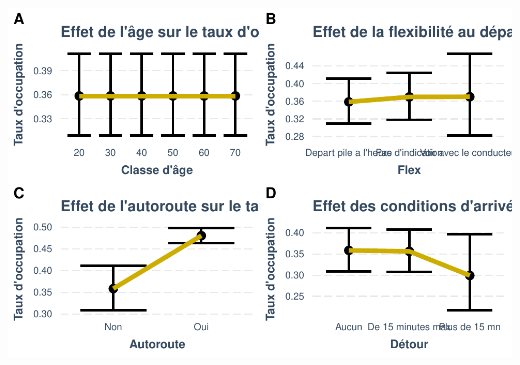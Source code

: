 \documentclass[
]{book}
\begin{document}
\includegraphics{bookdown-demo_files/figure-latex/0912-1.pdf}
\end{document}

